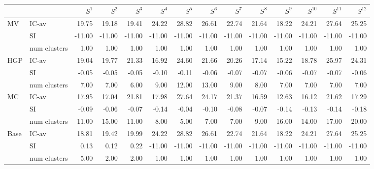 \begin{tabular}{llrrrrrrrrrrrr}
\toprule
 &  & $S^{1}$ & $S^{2}$ & $S^{3}$ & $S^{4}$ & $S^{5}$ & $S^{6}$ & $S^{7}$ & $S^{8}$ & $S^{9}$ & $S^{10}$ & $S^{11}$ & $S^{12}$ \\
\midrule
\multirow[c]{3}{*}{MV} & IC-av & 19.75 & 19.18 & 19.41 & 24.22 & 28.82 & 26.61 & 22.74 & 21.64 & 18.22 & 24.21 & 27.64 & 25.25 \\
 & SI & -11.00 & -11.00 & -11.00 & -11.00 & -11.00 & -11.00 & -11.00 & -11.00 & -11.00 & -11.00 & -11.00 & -11.00 \\
 & num clusters & 1.00 & 1.00 & 1.00 & 1.00 & 1.00 & 1.00 & 1.00 & 1.00 & 1.00 & 1.00 & 1.00 & 1.00 \\
\multirow[c]{3}{*}{HGP} & IC-av & 19.04 & 19.77 & 21.33 & 16.92 & 24.60 & 21.66 & 20.26 & 17.14 & 15.22 & 18.78 & 25.97 & 24.31 \\
 & SI & -0.05 & -0.05 & -0.05 & -0.10 & -0.11 & -0.06 & -0.07 & -0.07 & -0.06 & -0.07 & -0.07 & -0.06 \\
 & num clusters & 7.00 & 7.00 & 6.00 & 9.00 & 12.00 & 13.00 & 9.00 & 8.00 & 7.00 & 7.00 & 7.00 & 7.00 \\
\multirow[c]{3}{*}{MC} & IC-av & 17.95 & 17.04 & 21.81 & 17.98 & 27.64 & 24.17 & 21.37 & 16.59 & 12.63 & 16.12 & 21.62 & 17.29 \\
 & SI & -0.09 & -0.06 & -0.07 & -0.14 & -0.04 & -0.10 & -0.08 & -0.07 & -0.14 & -0.13 & -0.14 & -0.18 \\
 & num clusters & 11.00 & 15.00 & 11.00 & 8.00 & 5.00 & 7.00 & 7.00 & 9.00 & 16.00 & 14.00 & 17.00 & 20.00 \\
\multirow[c]{3}{*}{Base} & IC-av & 18.81 & 19.42 & 19.99 & 24.22 & 28.82 & 26.61 & 22.74 & 21.64 & 18.22 & 24.21 & 27.64 & 25.25 \\
 & SI & 0.13 & 0.12 & 0.22 & -11.00 & -11.00 & -11.00 & -11.00 & -11.00 & -11.00 & -11.00 & -11.00 & -11.00 \\
 & num clusters & 5.00 & 2.00 & 2.00 & 1.00 & 1.00 & 1.00 & 1.00 & 1.00 & 1.00 & 1.00 & 1.00 & 1.00 \\
\bottomrule
\end{tabular}

